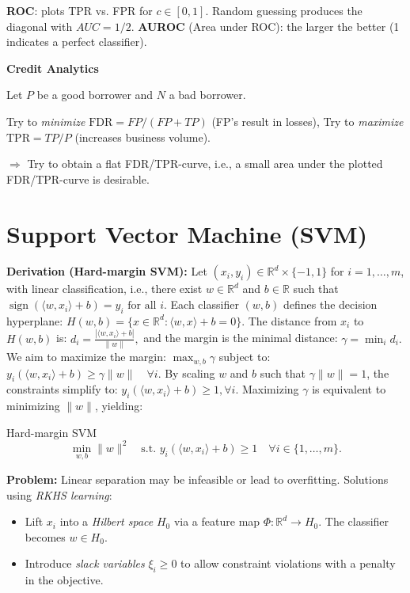 \documentclass[a4paper,10pt]{article}
\newenvironment{myitemize}
{\vspace{-0.25cm}\begin{itemize}}
{\end{itemize}}
\newcommand{\subtitle}[1]{\begin{normalsize}\vspace{0.25cm}\textbf{#1} \end{normalsize}}
\begin{document}
\begin{small}
\textbf{ROC}: plots TPR vs. FPR for $c \in [0, 1]$. Random guessing produces the diagonal with $AUC = 1/2$.
\textbf{AUROC} (Area under ROC): the larger the better (1 indicates a perfect classifier).

\subtitle{Credit Analytics}

Let $P$ be a good borrower and $N$ a bad borrower.

Try to \textit{minimize} $\text{FDR} = FP/(FP + TP)$ (FP’s result in losses), Try to \textit{maximize} $\text{TPR} = TP/P$ (increases business volume). 

$\Rightarrow$ Try to obtain a flat FDR/TPR-curve, i.e., a small area under the plotted FDR/TPR-curve is desirable.


\section{Support Vector Machine (SVM)}

\textbf{Derivation (Hard-margin SVM):} 
Let $ (x_i, y_i) \in \mathbb{R}^d \times \{-1, 1\} $ for $ i = 1, \dots, m $, with linear classification, i.e., there exist $ w \in \mathbb{R}^d $ and $ b \in \mathbb{R} $ such that
$
\operatorname{sign}(\langle w, x_i \rangle + b) = y_i \text{ for all } i.
$
Each classifier $ (w, b) $ defines the decision hyperplane:
$
H(w, b) = \{ x \in \mathbb{R}^d : \langle w, x \rangle + b = 0 \}.
$
The distance from $ x_i $ to $ H(w, b) $ is:
$
d_i = \frac{|\langle w, x_i \rangle + b|}{\|w\|},
$
and the margin is the minimal distance:
$
\gamma = \min_{i} d_i.
$
We aim to maximize the margin:
$
\max_{w, b} \gamma
$
subject to:
$
y_i (\langle w, x_i \rangle + b) \geq \gamma \|w\| \quad \forall i.
$
By scaling $ w $ and $ b $ such that $ \gamma \|w\| = 1 $, the constraints simplify to:
$
y_i (\langle w, x_i \rangle + b) \geq 1,  \forall i.
$
Maximizing $ \gamma $ is equivalent to minimizing $ \|w\| $, yielding:

\begin{subbox}{Hard-margin SVM}
$$
\min_{w, b} \|w\|^2
\quad 
\text{s.t. }
y_i (\langle w, x_i \rangle + b) \geq 1 \quad  \forall i \in \{1, \dots, m\}.
$$
\end{subbox}

\textbf{Problem:} Linear separation may be infeasible or lead to overfitting. Solutions using \textit{RKHS learning}:

\begin{myitemize}
    \item Lift $x_i$ into a \textit{Hilbert space} $H_0$ via a feature map $\Phi : \mathbb{R}^d \to H_0$. The classifier becomes $w \in H_0$.
    \item Introduce \textit{slack variables} $\xi_i \geq 0$ to allow constraint violations with a penalty in the objective.
\end{myitemize}


\end{small}
\end{document}
